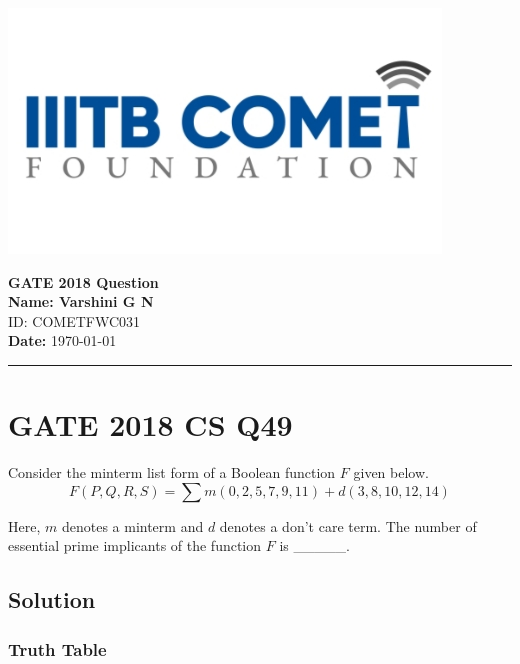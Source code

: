 \documentclass[12pt,a4paper]{article}
\begin{document}
\begin{center}
\begin{minipage}{0.20\textwidth}
    \includegraphics[width=\linewidth]{iiit_logo.png}
\end{minipage}
\hfill
\begin{minipage}{0.75\textwidth}
    \centering
    {\Large \textbf{GATE 2018 Question}\\[1ex]}
    {\textbf{Name: Varshini G N}\\[0.5ex]}
    {ID: COMETFWC031}\\[0.5ex]
    \textbf{Date:} \today
\end{minipage}
\end{center}
\vspace{1em}
\hrule
\vspace{1em}

\section*{GATE 2018 CS Q49}

Consider the minterm list form of a Boolean function \( F \) given below.
\[
F(P, Q, R, S) = \sum m(0, 2, 5, 7, 9, 11) + d(3, 8, 10, 12, 14)
\]

Here, \( m \) denotes a minterm and \( d \) denotes a don't care term. The number of essential prime implicants of the function \( F \) is \_\_\_\_\_.

\vspace{1em}

\subsection*{Solution}

\subsubsection*{Truth Table}
\end{document}
